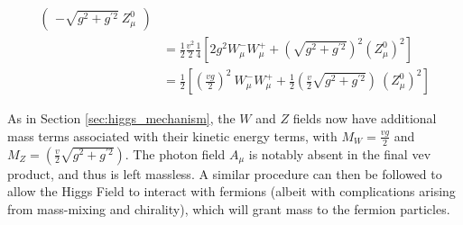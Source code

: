 \begin{equation}
\begin{split}
\begin{pmatrix}
                     - \sqrt{g^2 + g^{\prime 2}}\ Z^0_{\mu}
                \end{pmatrix} \\
            & = \frac{1}{2} \frac{v^2}{2} \frac{1}{4} 
                \left[ 2 g^2  W^-_{\mu} W^+_{\mu}
                + \left(\sqrt{g^2 + g^{\prime 2}}\right)^2 (Z^0_{\mu})^2 \right] \\
            & = \frac{1}{2} \left[ \left(\frac{vg}{2}\right)^2\  W^-_{\mu} W^+_{\mu}
                + \frac{1}{2} \left(\frac{v}{2}\sqrt{g^2 + g^{\prime 2}}\right)\ (Z^0_{\mu})^2 \right]
        \end{split} \end{equation}

        As in Section \ref{sec:higgs_mechanism}, the $W$ and $Z$ fields now have additional mass terms associated with their kinetic energy terms,
            with $M_W = \frac{vg}{2}$ and $M_Z = \left(\frac{v}{2}\sqrt{g^2 + g^{\prime 2}}\right) $.
        The photon field $A_{\mu}$ is notably absent in the final vev product, and thus is left massless.
        A similar procedure can then be followed to allow the Higgs Field to interact with fermions
            (albeit with complications arising from mass-mixing and chirality), which will grant mass to the fermion particles.




